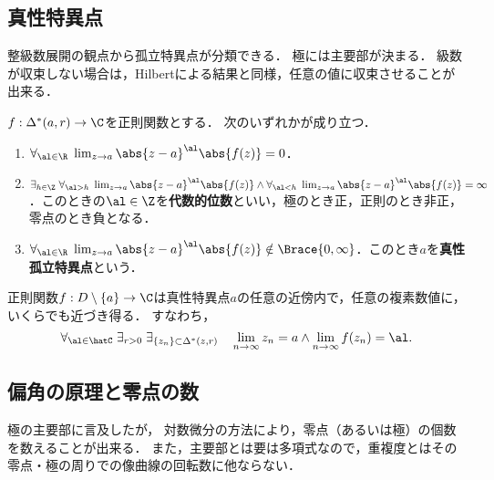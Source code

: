 \documentclass[uplatex, dvipdfmx]{jsreport}
\begin{document}
\subsection{真性特異点}

\begin{tcolorbox}[colframe=ForestGreen, colback=ForestGreen!10!white,breakable,colbacktitle=ForestGreen!40!white,coltitle=black,fonttitle=\bfseries\sffamily,
title=]
    整級数展開の観点から孤立特異点が分類できる．
    極には主要部が決まる．
    級数が収束しない場合は，Hilbertによる結果と同様，任意の値に収束させることが出来る．
\end{tcolorbox}

\begin{proposition}[孤立特異点の分類]
    $f:\Delta^*(a,r)\to\C$を正則関数とする．
    次のいずれかが成り立つ．
    \begin{enumerate}
        \item $\forall_{\al\in\R}\;\lim_{z\to a}\abs{z-a}^\al \abs{f(z)}=0$．
        \item $\exists_{h\in\Z}\;\forall_{\al>h}\;\lim_{z\to a}\abs{z-a}^\al\abs{f(z)}\land\forall_{\al<h}\;\lim_{z\to a}\abs{z-a}^\al\abs{f(z)}=\infty$．このときの$\al\in\Z$を\textbf{代数的位数}といい，極のとき正，正則のとき非正，零点のとき負となる．
        \item $\forall_{\al\in\R}\;\lim_{z\to a}\abs{z-a}^\al\abs{f(z)}\notin\Brace{0,\infty}$．このとき$a$を\textbf{真性孤立特異点}という．
    \end{enumerate}
\end{proposition}

\begin{theorem}[Weierstrass]
    正則関数$f:D\setminus\{a\}\to\C$は真性特異点$a$の任意の近傍内で，任意の複素数値に，いくらでも近づき得る．
    すなわち，
    \[\forall_{\al\in\hatC}\;\exists_{r>0}\;\exists_{\{z_n\}\subset\Delta^*(z,r)}\quad\lim_{n\to\infty}z_n=a\land\lim_{n\to\infty}f(z_n)=\al.\]
\end{theorem}

\subsection{偏角の原理と零点の数}

\begin{tcolorbox}[colframe=ForestGreen, colback=ForestGreen!10!white,breakable,colbacktitle=ForestGreen!40!white,coltitle=black,fonttitle=\bfseries\sffamily,
title=]
    極の主要部に言及したが，
    対数微分の方法により，零点（あるいは極）の個数を数えることが出来る．
    また，主要部とは要は多項式なので，重複度とはその零点・極の周りでの像曲線の回転数に他ならない．
\end{tcolorbox}
\end{document}
